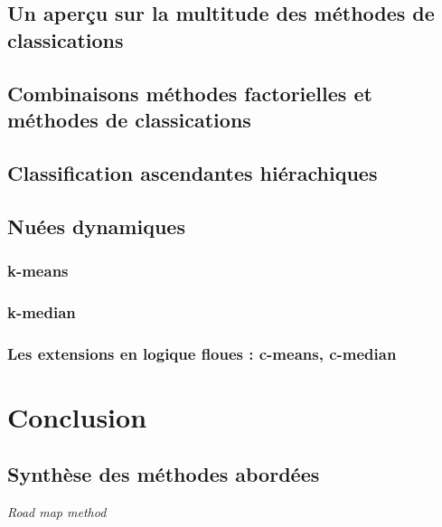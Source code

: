 \documentclass[
  11pt,
  french,
]{book}
\begin{document}
\hypertarget{sect111}{%
\section{Un aperçu sur la multitude des méthodes de classications}\label{sect111}}

\hypertarget{sect112}{%
\section{Combinaisons méthodes factorielles et méthodes de classications}\label{sect112}}

\hypertarget{sect113}{%
\section{Classification ascendantes hiérachiques}\label{sect113}}

\hypertarget{sect114}{%
\section{Nuées dynamiques}\label{sect114}}

\hypertarget{sect1141}{%
\subsection{k-means}\label{sect1141}}

\hypertarget{sect1142}{%
\subsection{k-median}\label{sect1142}}

\hypertarget{sect1143}{%
\subsection{Les extensions en logique floues : c-means, c-median}\label{sect1143}}

\hypertarget{conclusion}{%
\chapter{Conclusion}\label{conclusion}}

\hypertarget{sect121}{%
\section{Synthèse des méthodes abordées}\label{sect121}}

\emph{Road map method}
\end{document}
